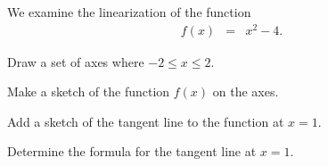 \begin{problem}
\item We examine the linearization of the function
  \begin{eqnarray*}
    f(x) & = & x^2-4.
  \end{eqnarray*}
  \begin{subproblem}
  \item Draw a set of axes where $-2\leq x \leq 2$.


    \vfill

  \item Make a sketch of the function $f(x)$ on the axes.
  \item Add a sketch of the tangent line to the function at $x=1$.
  \item Determine the formula for the tangent line at $x=1$.
    \vfill

  \end{subproblem}
\end{problem}


